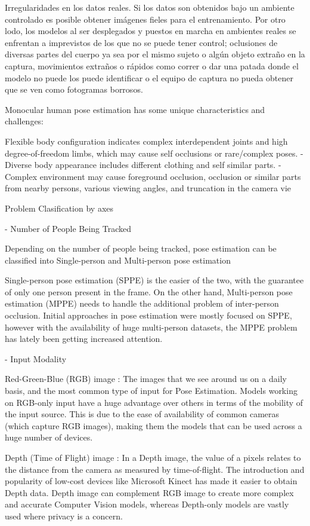 Irregularidades en los datos reales.
Si los datos son obtenidos bajo un ambiente controlado es posible obtener imágenes fieles para el
entrenamiento. Por otro lodo, los modelos al ser desplegados y puestos en marcha en ambientes reales
se enfrentan a imprevistos de los que no se puede tener control; oclusiones de diversas partes del
cuerpo ya sea por el mismo sujeto o algún objeto extraño en la captura, movimientos extraños o rápidos
como correr o dar una patada donde el modelo no puede los puede identificar o el equipo de captura
no pueda obtener que se ven como fotogramas borrosos.

Monocular human pose estimation has some unique characteristics
and challenges:

Flexible body configuration indicates complex interdependent
joints and high degree-of-freedom limbs, which may cause self occlusions or rare/complex poses.
- Diverse body appearance includes different clothing and self similar parts.
- Complex environment may cause foreground occlusion, occlusion
or similar parts from nearby persons, various viewing angles, and
truncation in the camera vie


Problem Clasification by axes


- Number of People Being Tracked

Depending on the number of people being tracked, pose estimation can be classified into
Single-person and Multi-person pose estimation

Single-person pose estimation (SPPE) is the easier of the two, with the guarantee of only one person
present in the frame. On the other hand, Multi-person pose estimation (MPPE) needs to handle the
additional problem of inter-person occlusion. Initial approaches in pose estimation were mostly
focused on SPPE, however with the availability of huge multi-person datasets, the MPPE problem has
lately been getting increased attention.

- Input Modality

Red-Green-Blue (RGB) image : The images that we see around us on a daily basis, and the most common
type of input for Pose Estimation. Models working on RGB-only input have a huge advantage over
others in terms of the mobility of the input source. This is due to the ease of availability of
common cameras (which capture RGB images), making them the models that can be used across a huge
number of devices.

Depth (Time of Flight) image : In a Depth image, the value of a pixels relates to the distance from
the camera as measured by time-of-flight. The introduction and popularity of low-cost devices
like Microsoft Kinect has made it easier to obtain Depth data. Depth image can complement RGB image
to create more complex and accurate Computer Vision models, whereas Depth-only models are vastly
used where privacy is a concern.

